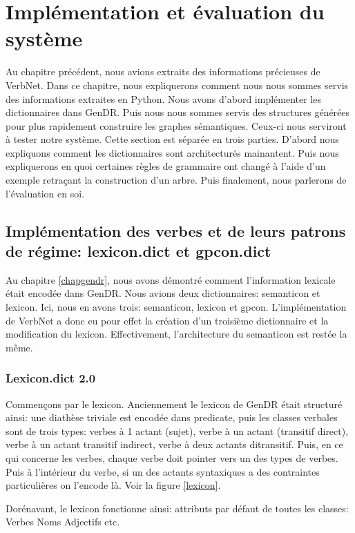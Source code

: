 \chapter{Implémentation et évaluation du système}\label{eval}

Au chapitre précédent, nous avions extraits des informations précieuses de VerbNet. Dans ce chapitre, nous expliquerons comment nous nous sommes servis des informations extraites en Python. Nous avons d'abord implémenter les dictionnaires dans GenDR. Puis nous nous sommes servis des structures générées pour plus rapidement construire les graphes sémantiques. Ceux-ci nous serviront à tester notre système. Cette section est séparée en trois parties. D'abord nous expliquons comment les dictionnaires sont architecturés mainantent. Puis nous expliquerons en quoi certaines règles de grammaire ont changé à l'aide d'un exemple retraçant la construction d'un arbre. Puis finalement, nous parlerons de l'évaluation en soi.

\section{Implémentation des verbes et de leurs patrons de régime: lexicon.dict et gpcon.dict}

Au chapitre \ref{chapgendr}, nous avons démontré comment l'information lexicale était encodée dans GenDR. Nous avions deux dictionnaires: semanticon et lexicon. Ici, nous en avons trois: semanticon, lexicon et gpcon. L'implémentation de VerbNet a donc eu pour effet la création d'un troisième dictionnaire et la modification du lexicon. Effectivement, l'architecture du semanticon est restée la même.

\subsection{Lexicon.dict 2.0}
Commençons par le lexicon. Anciennement le lexicon de GenDR était structuré ainsi: une diathèse triviale est encodée dans predicate, puis les classes verbales sont de trois types: verbes à 1 actant (sujet), verbe à un actant (transitif direct), verbe à un actant transitif indirect, verbe à deux actants ditransitif. Puis, en ce qui concerne les verbes, chaque verbe doit pointer vers un des types de verbes. Puis à l'intérieur du verbe, si un des actants syntaxiques a des contraintes particulières on l'encode là. Voir la figure \ref{lexicon}.

Dorénavant, le lexicon fonctionne ainsi:
attributs par défaut de toutes les classes: 
Verbes
Noms
Adjectifs
etc.


